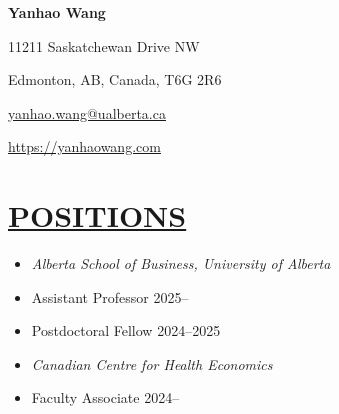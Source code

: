 \documentclass{res}
\begin{document}
\begin{resume}

\vspace{-50pt}

\begin{center}
  {\huge \textbf{Yanhao Wang}}
\end{center}

\setlength{\columnsep}{0.6cm}
\begin{multicols}{2}
{\small 11211 Saskatchewan Drive NW}

\vspace{-13pt}
{\small Edmonton, AB, Canada, T6G 2R6} 

\columnbreak
{\small \hfill \href{mailto:yanhao.wang@ualberta.ca}{yanhao.wang@ualberta.ca}}

\vspace{-13pt}
{\small \hfill \url{https://yanhaowang.com}}


\end{multicols}

\section{\large{\ul{POSITIONS}}}
\vspace{1.8em}
\begin{itemize}[leftmargin=15pt,labelindent=-15pt,itemindent=-15pt,itemsep=0.1em]
  \item[] \textit{Alberta School of Business, University of Alberta}
  \item[] \hspace{13pt} Assistant Professor \hfill    2025--
  \item[] \hspace{13pt} Postdoctoral Fellow \hfill    2024--2025
  \item[] \textit{Canadian Centre for Health Economics} 
  \item[] \hspace{13pt} Faculty Associate \hfill    2024--
\end{itemize}


\end{resume}
\end{document}
